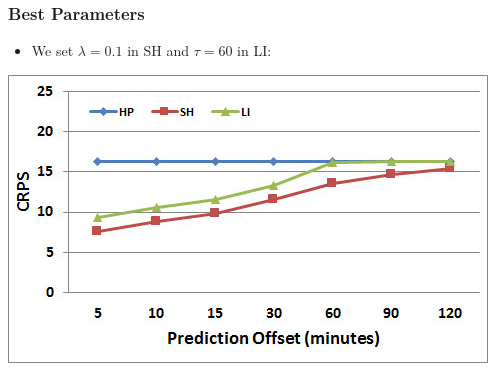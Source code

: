\documentclass[t]{beamer}
\begin{document}
\begin{frame}\frametitle{Best Parameters}
\begin{itemize}
\item We set $\lambda = 0.1$ in SH and $\tau = 60$ in LI:
\end{itemize}
\begin{center}
	\includegraphics[scale=0.5]{Links_Best.jpg}
\end{center}
\end{frame}
\end{document}
